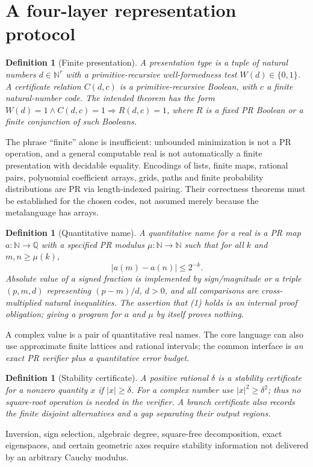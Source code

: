 \documentclass[11pt]{article}
\newtheorem{definition}[theorem]{Definition}
\newcommand{\NN}{\mathbb N}\newcommand{\QQ}{\mathbb Q}\newcommand{\PR}{\mathrm{PR}}\newcommand{\iPRA}{\mathrm{iPRA}}\newcommand{\eps}{\varepsilon}
\begin{document}
\section{A four-layer representation protocol}
\begin{definition}[Finite presentation]
A presentation type is a tuple of natural numbers $d\in\NN^r$ with a primitive-recursive well-formedness test $W(d)\in\{0,1\}$. A \emph{certificate relation} $C(d,c)$ is a primitive-recursive Boolean, with $c$ a finite natural-number code.  The intended theorem has the form $W(d)=1\land C(d,c)=1\Rightarrow R(d,c)=1$, where $R$ is a fixed PR Boolean or a finite conjunction of such Booleans.
\end{definition}
The phrase ``finite'' alone is insufficient: unbounded minimization is not a PR operation, and a general computable real is not automatically a finite presentation with decidable equality.  Encodings of lists, finite maps, rational pairs, polynomial coefficient arrays, grids, paths and finite probability distributions are PR via length-indexed pairing. Their correctness theorems must be established for the chosen codes, not assumed merely because the metalanguage has arrays.

\begin{definition}[Quantitative name]
A quantitative name for a real is a PR map $a:\NN\to\QQ$ with a specified PR modulus $\mu:\NN\to\NN$ such that for all $k$ and $m,n\ge\mu(k)$,
\[|a(m)-a(n)|\le 2^{-k}.\tag{1}\]
Absolute value of a signed fraction is implemented by sign/magnitude or a triple $(p,m,d)$ representing $(p-m)/d$, $d>0$, and all comparisons are cross-multiplied natural inequalities.  The assertion that (1) holds is an \emph{internal proof obligation}; giving a program for $a$ and $\mu$ by itself proves nothing.
\end{definition}
A complex value is a pair of quantitative real names.  The core language can also use approximate finite lattices and rational intervals; the common interface is \emph{an exact PR verifier plus a quantitative error budget}.

\begin{definition}[Stability certificate]
A positive rational $\delta$ is a stability certificate for a nonzero quantity $x$ if $|x|\ge\delta$. For a complex number use $|x|^2\ge\delta^2$; thus no square-root operation is needed in the verifier.  A branch certificate also records the finite disjoint alternatives and a gap separating their output regions.
\end{definition}
Inversion, sign selection, algebraic degree, square-free decomposition, exact eigenspaces, and certain geometric axes require stability information not delivered by an arbitrary Cauchy modulus.
\end{document}
